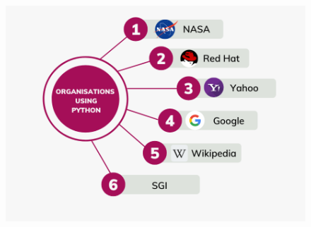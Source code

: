 \begin{flushleft}
		\begin{figure}[h!]
			\centering
			\includegraphics[scale=0.6]{content/chapter0/images/pic3.png}
		\end{figure}		
		
		
\end{flushleft}


\newpage



